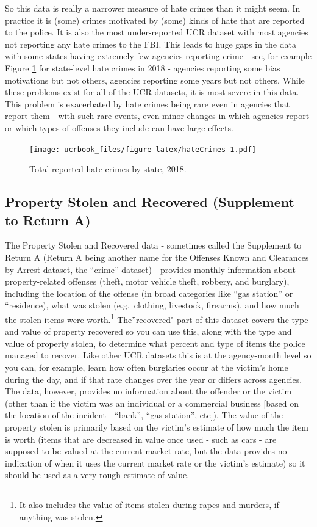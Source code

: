 \documentclass[
  12pt,
  openany]{book}
\begin{document}
So this data is really a narrower measure of hate crimes than it might seem. In practice it is (some) crimes motivated by (some) kinds of hate that are reported to the police. It is also the most under-reported UCR dataset with most agencies not reporting any hate crimes to the FBI. This leads to huge gaps in the data with some states having extremely few agencies reporting crime - see, for example Figure \ref{fig:hateCrimes} for state-level hate crimes in 2018 - agencies reporting some bias motivations but not others, agencies reporting some years but not others. While these problems exist for all of the UCR datasets, it is most severe in this data. This problem is exacerbated by hate crimes being rare even in agencies that report them - with such rare events, even minor changes in which agencies report or which types of offenses they include can have large effects.

\begin{figure}
\centering
\texttt{[image: ucrbook\_files/figure-latex/hateCrimes-1.pdf]}
\caption{\label{fig:hateCrimes}Total reported hate crimes by state, 2018.}
\end{figure}

\hypertarget{property-stolen-and-recovered-supplement-to-return-a}{%
\subsection{Property Stolen and Recovered (Supplement to Return A)}\label{property-stolen-and-recovered-supplement-to-return-a}}

The Property Stolen and Recovered data - sometimes called the Supplement to Return A (Return A being another name for the Offenses Known and Clearances by Arrest dataset, the ``crime'' dataset) - provides monthly information about property-related offenses (theft, motor vehicle theft, robbery, and burglary), including the location of the offense (in broad categories like ``gas station'' or ``residence), what was stolen (e.g.~clothing, livestock, firearms), and how much the stolen items were worth.\footnote{It also includes the value of items stolen during rapes and murders, if anything was stolen.} The''recovered" part of this dataset covers the type and value of property recovered so you can use this, along with the type and value of property stolen, to determine what percent and type of items the police managed to recover. Like other UCR datasets this is at the agency-month level so you can, for example, learn how often burglaries occur at the victim's home during the day, and if that rate changes over the year or differs across agencies. The data, however, provides no information about the offender or the victim (other than if the victim was an individual or a commercial business {[}based on the location of the incident - ``bank'', ``gas station'', etc{]}). The value of the property stolen is primarily based on the victim's estimate of how much the item is worth (items that are decreased in value once used - such as cars - are supposed to be valued at the current market rate, but the data provides no indication of when it uses the current market rate or the victim's estimate) so it should be used as a very rough estimate of value.
\end{document}
